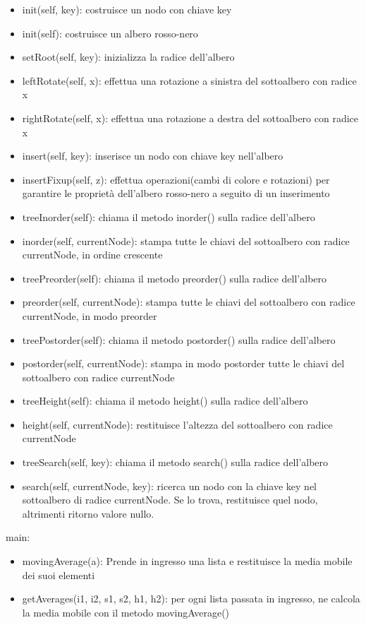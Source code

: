 \documentclass{article}
\begin{document}
\begin{itemize}
\item init(self, key): costruisce un nodo con chiave key
\item init(self): costruisce un albero rosso-nero
\item setRoot(self, key): inizializza la radice dell'albero
\item leftRotate(self, x): effettua una rotazione a sinistra del sottoalbero con radice x
\item rightRotate(self, x): effettua una rotazione a destra del sottoalbero con radice x
\item insert(self, key): inserisce un nodo con chiave key nell'albero
\item insertFixup(self, z): effettua operazioni(cambi di colore e rotazioni) per garantire le proprietà dell'albero rosso-nero a seguito di un inserimento
\item treeInorder(self): chiama il metodo inorder() sulla radice dell'albero
\item inorder(self, currentNode): stampa tutte le chiavi del sottoalbero con radice currentNode, in ordine crescente
\item treePreorder(self): chiama il metodo preorder() sulla radice dell'albero
\item preorder(self, currentNode): stampa tutte le chiavi del sottoalbero con radice currentNode, in modo preorder
\item treePostorder(self): chiama il metodo postorder() sulla radice dell'albero
\item postorder(self, currentNode): stampa in modo postorder tutte le chiavi del sottoalbero con radice currentNode
\item treeHeight(self): chiama il metodo height() sulla radice dell'albero
\item height(self, currentNode): restituisce l'altezza del sottoalbero con radice currentNode
\item treeSearch(self, key): chiama il metodo search() sulla radice dell'albero
\item search(self, currentNode, key): ricerca un nodo con la chiave key nel sottoalbero di radice currentNode. Se lo trova, restituisce quel nodo, altrimenti ritorno valore nullo.
\end{itemize}
main:
\begin{itemize}
\item movingAverage(a): Prende in ingresso una lista e restituisce la media mobile dei suoi elementi
\item getAverages(i1, i2, s1, s2, h1, h2): per ogni lista passata in ingresso, ne calcola la media mobile con il metodo movingAverage()
\end{itemize}
\end{document}
